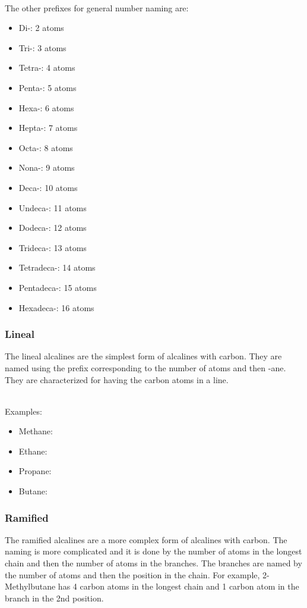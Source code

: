 \,\\
The other prefixes for general number naming are:
\begin{itemize}
    \item Di-: 2 atoms
    \item Tri-: 3 atoms
    \item Tetra-: 4 atoms
    \item Penta-: 5 atoms
    \item Hexa-: 6 atoms
    \item Hepta-: 7 atoms
    \item Octa-: 8 atoms
    \item Nona-: 9 atoms
    \item Deca-: 10 atoms
    \item Undeca-: 11 atoms
    \item Dodeca-: 12 atoms
    \item Trideca-: 13 atoms
    \item Tetradeca-: 14 atoms
    \item Pentadeca-: 15 atoms
    \item Hexadeca-: 16 atoms
\end{itemize}
\subsubsection{Lineal}
The lineal alcalines are the simplest form of alcalines with carbon. They are named using the prefix corresponding to the number of atoms and then -ane. They are characterized for having the carbon atoms in a line.

\,\\
Examples:
\begin{itemize}
    \item Methane: 
    \item Ethane: 
    \item Propane: 
    \item Butane: 
\end{itemize}
\subsubsection{Ramified}
The ramified alcalines are a more complex form of alcalines with carbon. The naming is more complicated and it is done by the number of atoms in the longest chain and then the number of atoms in the branches. The branches are named by the number of atoms and then the position in the chain. For example, 2-Methylbutane has 4 carbon atoms in the longest chain and 1 carbon atom in the branch in the 2nd position.

